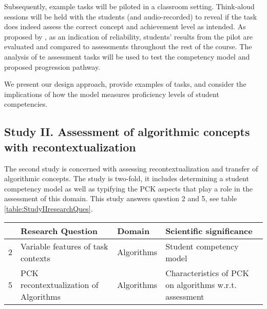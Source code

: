 Subsequently, example tasks will be piloted in a classroom setting. Think-aloud sessions will be held with the students (and audio-recorded) to reveal if the task does indeed assess the correct concept and achievement level as intended. As proposed by , as an indication of reliability, students' results from the pilot are evaluated and compared to assessments throughout the rest of the course. The analysis of te assessment tasks will be used to test the competency model and proposed progression pathway.

%


We present our design approach, provide examples of tasks, and consider the implications of how the model measures proficiency levels of student competencies.


\subsection{Study II. Assessment of algorithmic concepts with recontextualization} %

The second study is concerned with assessing recontextualization and transfer of algorithmic concepts. The study is two-fold, it includes determining a student competency model as well as typifying the PCK aspects that play a role in the assessment of this domain. This study answers question 2 and 5, see table \ref{table:StudyIIresearchQues}.
\begin{table*}
  \centering
\begin{tabular}{|c|p{70mm}|l|p{50mm}|}
   \hline
    &\textbf{Research Question} & \textbf{Domain} & \textbf{Scientific significance}\\
  \hline

  2 & Variable features of task contexts& Algorithms & Student competency model \\ \hline
  5 & PCK recontextualization of Algorithms & Algorithms & Characteristics of PCK on algorithms w.r.t. assessment\\
  \hline
\end{tabular}
\caption{Overview study II: Assessment of algorithmic concepts with recontextualization}\label{table:StudyIIresearchQues}
\end{table*}


